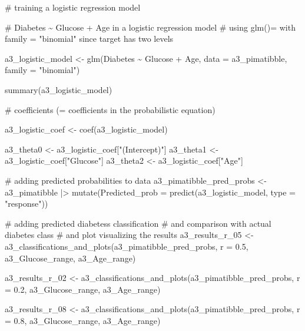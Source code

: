 \documentclass[
  english,
  11pt,
]{article}
\newenvironment{Shaded}{\begin{snugshade}}{\end{snugshade}}
\newcommand{\AttributeTok}[1]{\textcolor[rgb]{0.40,0.45,0.13}{#1}}
\newcommand{\CommentTok}[1]{\textcolor[rgb]{0.37,0.37,0.37}{#1}}
\newcommand{\FloatTok}[1]{\textcolor[rgb]{0.68,0.00,0.00}{#1}}
\newcommand{\FunctionTok}[1]{\textcolor[rgb]{0.28,0.35,0.67}{#1}}
\newcommand{\NormalTok}[1]{\textcolor[rgb]{0.00,0.23,0.31}{#1}}
\newcommand{\OtherTok}[1]{\textcolor[rgb]{0.00,0.23,0.31}{#1}}
\newcommand{\SpecialCharTok}[1]{\textcolor[rgb]{0.37,0.37,0.37}{#1}}
\newcommand{\StringTok}[1]{\textcolor[rgb]{0.13,0.47,0.30}{#1}}
\begin{document}
\begin{Shaded}
\begin{Highlighting}[]
\CommentTok{\# training a logistic regression model}

\CommentTok{\# Diabetes \textasciitilde{} Glucose + Age in a logistic regression model}
\CommentTok{\# using glm()= with family = "binomial" since target has two levels}

\NormalTok{a3\_logistic\_model }\OtherTok{\textless{}{-}}
  \FunctionTok{glm}\NormalTok{(Diabetes }\SpecialCharTok{\textasciitilde{}}\NormalTok{ Glucose }\SpecialCharTok{+}\NormalTok{ Age, }\AttributeTok{data =}\NormalTok{ a3\_pimatibble, }\AttributeTok{family =} \StringTok{"binomial"}\NormalTok{)}

\FunctionTok{summary}\NormalTok{(a3\_logistic\_model)}

\CommentTok{\# coefficients (= coefficients in the probabilistic equation)}

\NormalTok{a3\_logistic\_coef }\OtherTok{\textless{}{-}} \FunctionTok{coef}\NormalTok{(a3\_logistic\_model)}

\NormalTok{a3\_theta0 }\OtherTok{\textless{}{-}}\NormalTok{ a3\_logistic\_coef[}\StringTok{"(Intercept)"}\NormalTok{]}
\NormalTok{a3\_theta1 }\OtherTok{\textless{}{-}}\NormalTok{ a3\_logistic\_coef[}\StringTok{"Glucose"}\NormalTok{]}
\NormalTok{a3\_theta2 }\OtherTok{\textless{}{-}}\NormalTok{ a3\_logistic\_coef[}\StringTok{"Age"}\NormalTok{]}

\CommentTok{\# adding predicted probabilities to data}
\NormalTok{a3\_pimatibble\_pred\_probs }\OtherTok{\textless{}{-}}
\NormalTok{  a3\_pimatibble }\SpecialCharTok{|\textgreater{}}
  \FunctionTok{mutate}\NormalTok{(}\AttributeTok{Predicted\_prob =} \FunctionTok{predict}\NormalTok{(a3\_logistic\_model, }\AttributeTok{type =} \StringTok{"response"}\NormalTok{))}

\CommentTok{\# adding predicted diabetess classification}
\CommentTok{\# and comparison with actual diabetes class}
\CommentTok{\# and plot visualizing the results}
\NormalTok{a3\_results\_r\_05 }\OtherTok{\textless{}{-}}
  \FunctionTok{a3\_classifications\_and\_plots}\NormalTok{(a3\_pimatibble\_pred\_probs,}
                               \AttributeTok{r =} \FloatTok{0.5}\NormalTok{, a3\_Glucose\_range, a3\_Age\_range)}

\NormalTok{a3\_results\_r\_02 }\OtherTok{\textless{}{-}}
  \FunctionTok{a3\_classifications\_and\_plots}\NormalTok{(a3\_pimatibble\_pred\_probs,}
                               \AttributeTok{r =} \FloatTok{0.2}\NormalTok{, a3\_Glucose\_range, a3\_Age\_range)}

\NormalTok{a3\_results\_r\_08 }\OtherTok{\textless{}{-}}
  \FunctionTok{a3\_classifications\_and\_plots}\NormalTok{(a3\_pimatibble\_pred\_probs,}
                            \AttributeTok{r =} \FloatTok{0.8}\NormalTok{, a3\_Glucose\_range, a3\_Age\_range)}


\end{Highlighting}
\end{Shaded}
\end{document}
